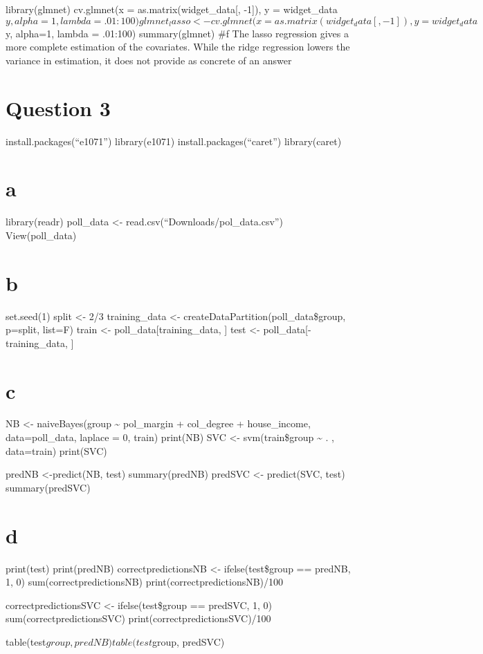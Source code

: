 \documentclass[]{article}
\begin{document}
library(glmnet) cv.glmnet(x = as.matrix(widget\_data{[}, -1{]}), y =
widget\_data\(y, alpha=1, lambda = .01:100) glmnet_lasso <- cv.glmnet(x = as.matrix(widget_data[, -1]), y = widget_data\)y,
alpha=1, lambda = .01:100) summary(glmnet) \#f The lasso regression
gives a more complete estimation of the covariates. While the ridge
regression lowers the variance in estimation, it does not provide as
concrete of an answer

\section{Question 3}\label{question-3}

install.packages(``e1071'') library(e1071) install.packages(``caret'')
library(caret)

\section{a}\label{a-2}

library(readr) poll\_data \textless{}-
read.csv(``Downloads/pol\_data.csv'') View(poll\_data)

\section{b}\label{b-2}

set.seed(1) split \textless{}- 2/3 training\_data \textless{}-
createDataPartition(poll\_data\$group, p=split, list=F) train
\textless{}- poll\_data{[}training\_data, {]} test \textless{}-
poll\_data{[}-training\_data, {]}

\section{c}\label{c-2}

NB \textless{}- naiveBayes(group \textasciitilde{} pol\_margin +
col\_degree + house\_income, data=poll\_data, laplace = 0, train)
print(NB) SVC \textless{}- svm(train\$group \textasciitilde{} . ,
data=train) print(SVC)

predNB \textless{}-predict(NB, test) summary(predNB) predSVC
\textless{}- predict(SVC, test) summary(predSVC)

\section{d}\label{d-2}

print(test) print(predNB) correctpredictionsNB \textless{}-
ifelse(test\$group == predNB, 1, 0) sum(correctpredictionsNB)
print(correctpredictionsNB)/100

correctpredictionsSVC \textless{}- ifelse(test\$group == predSVC, 1, 0)
sum(correctpredictionsSVC) print(correctpredictionsSVC)/100

table(test\(group, predNB) table(test\)group, predSVC)
\end{document}
